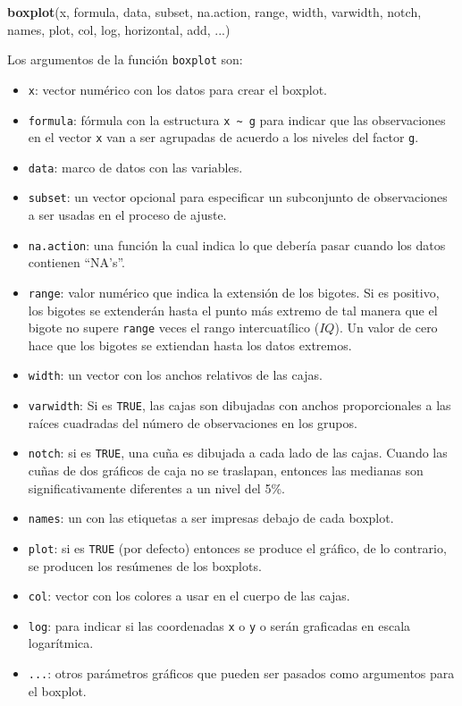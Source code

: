 \documentclass[10pt,]{krantz}
\makeatletter
\newenvironment{Shaded}{\begin{snugshade}}{\end{snugshade}}
\newcommand{\KeywordTok}[1]{\textcolor[rgb]{0.13,0.29,0.53}{\textbf{#1}}}
\newcommand{\NormalTok}[1]{#1}
\providecommand{\tightlist}{%
  \setlength{\itemsep}{0pt}\setlength{\parskip}{0pt}}
\let\code=\texttt
\newenvironment{kframe}{%
\medskip{}
\setlength{\fboxsep}{.8em}
 \def\at@end@of@kframe{}%
 \ifinner\ifhmode%
  \def\at@end@of@kframe{\end{minipage}}%
  \begin{minipage}{\columnwidth}%
 \fi\fi%
 \def\FrameCommand##1{\hskip\@totalleftmargin \hskip-\fboxsep
 \colorbox{shadecolor}{##1}\hskip-\fboxsep
     \hskip-\linewidth \hskip-\@totalleftmargin \hskip\columnwidth}%
 \MakeFramed {\advance\hsize-\width
   \@totalleftmargin\z@ \linewidth\hsize
   \@setminipage}}%
 {\par\unskip\endMakeFramed%
 \at@end@of@kframe}
\renewenvironment{Shaded}{\begin{kframe}}{\end{kframe}}
\makeatother
\begin{document}
\begin{Shaded}
\begin{Highlighting}[]
\KeywordTok{boxplot}\NormalTok{(x, formula, data, subset, na.action,}
\NormalTok{        range, width, varwidth, notch, names, }
\NormalTok{        plot, col, log, horizontal, add, ...)}
\end{Highlighting}
\end{Shaded}

Los argumentos de la función \texttt{boxplot} son:

\begin{itemize}
\tightlist
\item
  \texttt{x}: vector numérico con los datos para crear el boxplot.
\item
  \texttt{formula}: fórmula con la estructura
  \texttt{x\ \textasciitilde{}\ g} para indicar que las observaciones en
  el vector \texttt{x} van a ser agrupadas de acuerdo a los niveles del
  factor \texttt{g}.
\item
  \texttt{data}: marco de datos con las variables.
\item
  \texttt{subset}: un vector opcional para especificar un subconjunto de
  observaciones a ser usadas en el proceso de ajuste.
\item
  \texttt{na.action}: una función la cual indica lo que debería pasar
  cuando los datos contienen ``NA's''.
\item
  \texttt{range}: valor numérico que indica la extensión de los bigotes.
  Si es positivo, los bigotes se extenderán hasta el punto más extremo
  de tal manera que el bigote no supere \code{range} veces el rango
  intercuatílico (\(IQ\)). Un valor de cero hace que los bigotes se
  extiendan hasta los datos extremos.
\item
  \texttt{width}: un vector con los anchos relativos de las cajas.
\item
  \texttt{varwidth}: Si es \texttt{TRUE}, las cajas son dibujadas con
  anchos proporcionales a las raíces cuadradas del número de
  observaciones en los grupos.
\item
  \texttt{notch}: si es \texttt{TRUE}, una cuña es dibujada a cada lado
  de las cajas. Cuando las cuñas de dos gráficos de caja no se
  traslapan, entonces las medianas son significativamente diferentes a
  un nivel del 5\%.
\item
  \texttt{names}: un con las etiquetas a ser impresas debajo de cada
  boxplot.
\item
  \texttt{plot}: si es \texttt{TRUE} (por defecto) entonces se produce
  el gráfico, de lo contrario, se producen los resúmenes de los
  boxplots.
\item
  \texttt{col}: vector con los colores a usar en el cuerpo de las cajas.
\item
  \texttt{log}: para indicar si las coordenadas \texttt{x} o \texttt{y}
  o serán graficadas en escala logarítmica.
\item
  \texttt{...}: otros parámetros gráficos que pueden ser pasados como
  argumentos para el boxplot.
\end{itemize}
\end{document}
